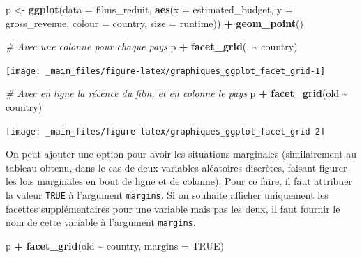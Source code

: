\documentclass[
  11pt,
]{book}
\newenvironment{Shaded}{\begin{snugshade}}{\end{snugshade}}
\newcommand{\CommentTok}[1]{\textcolor[rgb]{0.56,0.35,0.01}{\textit{#1}}}
\newcommand{\DataTypeTok}[1]{\textcolor[rgb]{0.13,0.29,0.53}{#1}}
\newcommand{\KeywordTok}[1]{\textcolor[rgb]{0.13,0.29,0.53}{\textbf{#1}}}
\newcommand{\NormalTok}[1]{#1}
\newcommand{\OperatorTok}[1]{\textcolor[rgb]{0.81,0.36,0.00}{\textbf{#1}}}
\newcommand{\OtherTok}[1]{\textcolor[rgb]{0.56,0.35,0.01}{#1}}
\newcommand{\StringTok}[1]{\textcolor[rgb]{0.31,0.60,0.02}{#1}}
\numberwithin{equation}{section}
\numberwithin{countremarque}{section}
\begin{document}
\begin{Shaded}
\begin{Highlighting}[]
\NormalTok{p \textless{}{-}}\StringTok{ }\KeywordTok{ggplot}\NormalTok{(}\DataTypeTok{data =}\NormalTok{ films\_reduit,}
            \KeywordTok{aes}\NormalTok{(}\DataTypeTok{x =}\NormalTok{ estimated\_budget,}
                \DataTypeTok{y =}\NormalTok{ gross\_revenue,}
                \DataTypeTok{colour =}\NormalTok{ country,}
                \DataTypeTok{size =}\NormalTok{ runtime)) }\OperatorTok{+}
\StringTok{  }\KeywordTok{geom\_point}\NormalTok{()}

\CommentTok{\# Avec une colonne pour chaque pays}
\NormalTok{p }\OperatorTok{+}\StringTok{ }\KeywordTok{facet\_grid}\NormalTok{(. }\OperatorTok{\textasciitilde{}}\StringTok{ }\NormalTok{country)}
\end{Highlighting}
\end{Shaded}

\begin{center}\texttt{[image: \_main\_files/figure-latex/graphiques\_ggplot\_facet\_grid-1]} \end{center}

\begin{Shaded}
\begin{Highlighting}[]
\CommentTok{\# Avec en ligne la récence du film, et en colonne le pays}
\NormalTok{p }\OperatorTok{+}\StringTok{ }\KeywordTok{facet\_grid}\NormalTok{(old }\OperatorTok{\textasciitilde{}}\StringTok{ }\NormalTok{country)}
\end{Highlighting}
\end{Shaded}

\begin{center}\texttt{[image: \_main\_files/figure-latex/graphiques\_ggplot\_facet\_grid-2]} \end{center}

On peut ajouter une option pour avoir les situations marginales (similairement au tableau obtenu, dans le cas de deux variables aléatoires discrètes, faisant figurer les lois marginales en bout de ligne et de colonne). Pour ce faire, il faut attribuer la valeur \texttt{TRUE} à l'argument \texttt{margins}. Si on souhaite afficher uniquement les facettes supplémentaires pour une variable mais pas les deux, il faut fournir le nom de cette variable à l'argument \texttt{margins}.

\begin{Shaded}
\begin{Highlighting}[]
\NormalTok{p }\OperatorTok{+}\StringTok{ }\KeywordTok{facet\_grid}\NormalTok{(old }\OperatorTok{\textasciitilde{}}\StringTok{ }\NormalTok{country, }\DataTypeTok{margins =} \OtherTok{TRUE}\NormalTok{)}
\end{Highlighting}
\end{Shaded}
\end{document}
